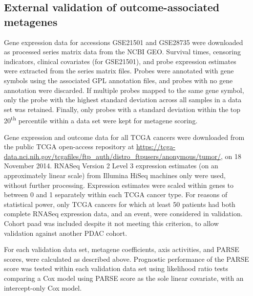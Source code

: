 \documentclass[dissertation.tex]{subfiles}
\begin{document}
\subsection{External validation of outcome-associated metagenes}
Gene expression data for accessions GSE21501 and GSE28735 were downloaded as processed series matrix data from the \gls{NCBI} \gls{GEO}.  Survival times, censoring indicators, clinical covariates (for GSE21501), and probe expression estimates were extracted from the series matrix files.  Probes were annotated with gene symbols using the associated GPL annotation files, and probes with no gene annotation were discarded.  If multiple probes mapped to the same gene symbol, only the probe with the highest standard deviation across all samples in a data set was retained.  Finally, only probes with a standard deviation within the top 20\textsuperscript{th} percentile within a data set were kept for metagene scoring.

Gene expression and outcome data for all \gls{TCGA} cancers were downloaded from the public \gls{TCGA} open-access repository at \url{https://tcga-data.nci.nih.gov/tcgafiles/ftp_auth/distro_ftpusers/anonymous/tumor/}, on 18 November 2014.  RNASeq Version 2 Level 3 expression estimates (on an approximately linear scale) from Illumina HiSeq machines only were used, without further processing.  Expression estimates were scaled within genes to between 0 and 1 separately within each \gls{TCGA} cancer type.  For reasons of statistical power, only \gls{TCGA} cancers for which at least 50 patients had both complete RNASeq expression data, and an event, were considered in validation.  Cohort paad was included despite it not meeting this criterion, to allow validation against another \gls{PDAC} cohort.

For each validation data set, metagene coefficients, axis activities, and \gls{PARSE} scores, were calculated as described above.  Prognostic performance of the \gls{PARSE} score was tested within each validation data set using likelihood ratio tests comparing a Cox model using \gls{PARSE} score as the sole linear covariate, with an intercept-only Cox model.
\end{document}

